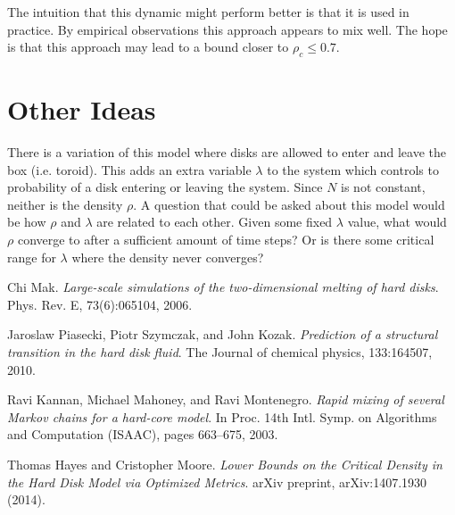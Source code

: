 \documentclass[a4paper,11pt]{article}
\begin{document}
The intuition that this dynamic might perform better is that it is used in practice.  By empirical observations this approach appears to mix well.  The hope is that this approach may lead to a bound closer to $\rho_c \le 0.7$.

\section*{Other Ideas}

There is a variation of this model where disks are allowed to enter and leave the box (i.e. toroid).  This adds an extra variable $\lambda$ to the system which controls to probability of a disk entering or leaving the system.  Since $N$ is not constant, neither is the density $\rho$.  A question that could be asked about this model would be how $\rho$ and $\lambda$ are related to each other.  Given some fixed $\lambda$ value, what would $\rho$ converge to after a sufficient amount of time steps? Or is there some critical range for $\lambda$ where the density never converges?

\begin{thebibliography}{9}


  Chi Mak. 
  \emph{Large-scale simulations of the two-dimensional melting of hard disks}.
  Phys. Rev. E,
  73(6):065104, 2006.

  Jaroslaw Piasecki, Piotr Szymczak, and John Kozak.
  \emph{Prediction of a structural transition in the hard disk fluid}.
  The Journal of chemical physics,
  133:164507, 2010.

  Ravi Kannan, Michael Mahoney, and Ravi Montenegro.
  \emph{Rapid mixing of several Markov chains for a hard-core model}.
  In Proc. 14th Intl. Symp. on Algorithms and Computation (ISAAC),
  pages 663–675, 2003.

  Thomas Hayes and Cristopher Moore.
  \emph{Lower Bounds on the Critical Density in the Hard Disk Model via Optimized Metrics}.
  arXiv preprint,
  arXiv:1407.1930 (2014).

\end{thebibliography}
\end{document}
